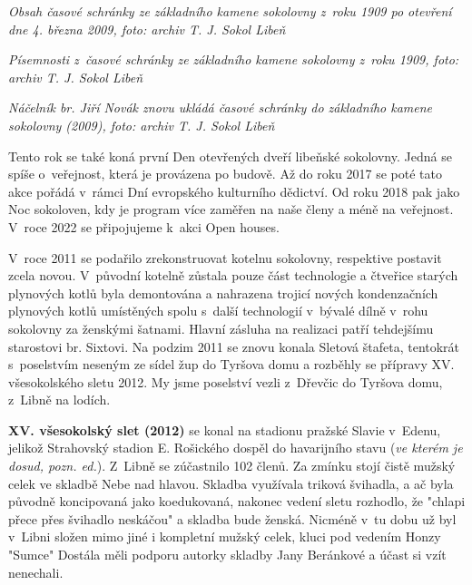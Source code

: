 \documentclass[a5paper, 12pt, twoside]{article}
\begin{document}

\textit{Obsah časové schránky ze základního kamene sokolovny z~roku 1909
po otevření dne 4. března 2009, foto: archiv T. J. Sokol Libeň}


\textit{Písemnosti z~časové schránky ze základního kamene sokolovny z~roku
1909, foto: archiv T. J. Sokol Libeň}


\textit{Náčelník br. Jiří Novák znovu ukládá časové schránky do základního
kamene sokolovny (2009), foto: archiv T. J. Sokol Libeň}

Tento rok se také koná první Den otevřených dveří libeňské sokolovny.
Jedná se spíše o~veřejnost, která je provázena po budově. Až do roku
2017 se poté tato akce pořádá v~rámci Dní evropského kulturního
dědictví. Od roku 2018 pak jako Noc sokoloven, kdy je program více
zaměřen na naše členy a méně na veřejnost. V~roce 2022 se připojujeme
k~akci Open houses.

V~roce 2011 se podařilo zrekonstruovat kotelnu sokolovny, respektive
postavit zcela novou. V~původní kotelně zůstala pouze část technologie a
čtveřice starých plynových kotlů byla demontována a nahrazena trojicí
nových kondenzačních plynových kotlů umístěných spolu s~další
technologií v~bývalé dílně v~rohu sokolovny za ženskými šatnami. Hlavní
zásluha na realizaci patří tehdejšímu starostovi br. Sixtovi. Na podzim
2011 se znovu konala Sletová štafeta, tentokrát s~poselstvím neseným ze
sídel žup do Tyršova domu a rozběhly se přípravy XV. všesokolského sletu
2012. My jsme poselství vezli z~Dřevčic do Tyršova domu, z~Libně na
lodích.

\textbf{XV. všesokolský slet (2012)} se konal na stadionu pražské Slavie
v~Edenu, jelikož Strahovský stadion E. Rošického dospěl do havarijního
stavu (\textit{ve kterém je dosud, pozn. ed.}). Z~Libně se zúčastnilo 102
členů. Za zmínku stojí čistě mužský celek ve skladbě Nebe nad hlavou.
Skladba využívala triková švihadla, a ač byla původně koncipovaná jako
koedukovaná, nakonec vedení sletu rozhodlo, že "chlapi přece přes
švihadlo neskáčou" a skladba bude ženská. Nicméně v~tu dobu už byl
v~Libni složen mimo jiné i kompletní mužský celek, kluci pod vedením Honzy
"Sumce" Dostála měli podporu autorky skladby Jany Beránkové a účast si
vzít nenechali.
\end{document}
